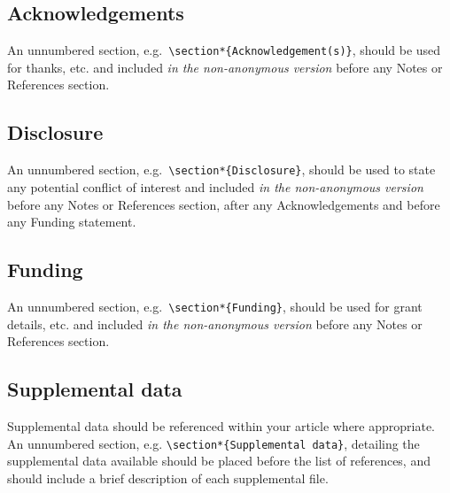\documentclass{tPRS2e}
\begin{document}
\subsection{Acknowledgements}

An unnumbered section, e.g.\ \verb"\section*{Acknowledgement(s)}", should be used for thanks, etc.
and included \emph{in the non-anonymous version} before any Notes or References section.


\subsection{Disclosure}

An unnumbered section, e.g.\ \verb"\section*{Disclosure}", should be used to state any potential conflict of interest
and included \emph{in the non-anonymous version} before any Notes or References section, after any Acknowledgements and before any Funding statement.


\subsection{Funding}

An unnumbered section, e.g.\ \verb"\section*{Funding}", should be used for grant details, etc.
and included \emph{in the non-anonymous version} before any Notes or References section.


\subsection{Supplemental data}

Supplemental data should be referenced within your article where appropriate. An unnumbered section, e.g. \verb"\section*{Supplemental data}", detailing the supplemental data available should be placed before the list of references, and should include a brief description of each supplemental file.
\end{document}
